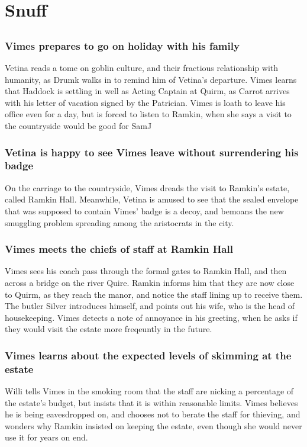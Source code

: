\section{Snuff}


\subsection{}
\subsubsection{\Gls{Vimes} prepares to go on holiday with his family}
\Gls{Vetina} reads a tome on goblin culture, and their fractious relationship with humanity, as
\Gls{Drumk} walks in to remind him of \Gls{Vetina}'s departure. \Gls{Vimes} learns that
\Gls{Haddock} is settling in well as Acting Captain at Quirm, as \Gls{Carrot} arrives with his
letter of vacation signed by the Patrician. \Gls{Vimes} is loath to leave his office even for a day,
but is forced to listen to \Gls{Ramkin}, when she says a visit to the countryside would be good for
\Gls{SamJ}

\subsubsection{\Gls{Vetina} is happy to see \Gls{Vimes} leave without surrendering his badge}
On the carriage to the countryside, \Gls{Vimes} dreads the visit to \Gls{Ramkin}'s estate, called
Ramkin Hall. Meanwhile, \Gls{Vetina} is amused to see that the sealed envelope that was supposed to
contain \Gls{Vimes}' badge is a decoy, and bemoans the new smuggling problem spreading among the
aristocrats in the city.

\subsubsection{\Gls{Vimes} meets the chiefs of staff at Ramkin Hall}
\Gls{Vimes} sees his coach pass through the formal gates to Ramkin Hall, and then across a bridge
on the river Quire. \Gls{Ramkin} informs him that they are now close to Quirm, as they reach the
manor, and notice the staff lining up to receive them. The butler \Gls{Silver} introduces himself,
and points out his wife, who is the head of housekeeping. \Gls{Vimes} detects a note of annoyance
in his greeting, when he asks if they would visit the estate more freqeuntly in the future.

\subsubsection{\Gls{Vimes} learns about the expected levels of skimming at the estate}
\Gls{Willi} tells \Gls{Vimes} in the smoking room that the staff are nicking a percentage of the
estate's budget, but insists that it is within reasonable limits. \Gls{Vimes} believes he is
being eavesdropped on, and chooses not to berate the staff for thieving, and wonders why
\Gls{Ramkin} insisted on keeping the estate, even though she would never use it for years on end.

